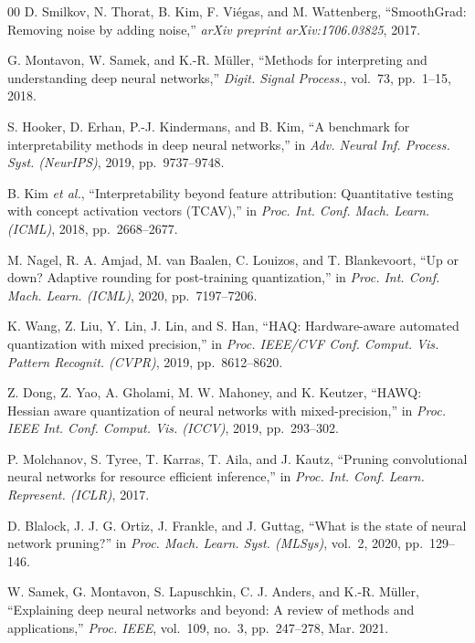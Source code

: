 \begin{thebibliography}{00}
D. Smilkov, N. Thorat, B. Kim, F. Vi\'egas, and M. Wattenberg, ``SmoothGrad:
Removing noise by adding noise,'' \textit{arXiv preprint arXiv:1706.03825},
2017.

G. Montavon, W. Samek, and K.-R. M\"uller, ``Methods for interpreting and
understanding deep neural networks,'' \textit{Digit. Signal Process.}, vol.\ 73,
pp.\ 1--15, 2018.

S. Hooker, D. Erhan, P.-J. Kindermans, and B. Kim, ``A benchmark for
interpretability methods in deep neural networks,'' in \textit{Adv. Neural Inf.
Process. Syst. (NeurIPS)}, 2019, pp.\ 9737--9748.

B. Kim \textit{et al.}, ``Interpretability beyond feature attribution:
Quantitative testing with concept activation vectors (TCAV),'' in \textit{Proc.
Int. Conf. Mach. Learn. (ICML)}, 2018, pp.\ 2668--2677.

M. Nagel, R. A. Amjad, M. van Baalen, C. Louizos, and T. Blankevoort, ``Up or
down? Adaptive rounding for post-training quantization,'' in \textit{Proc. Int.
Conf. Mach. Learn. (ICML)}, 2020, pp.\ 7197--7206.

K. Wang, Z. Liu, Y. Lin, J. Lin, and S. Han, ``HAQ: Hardware-aware automated
quantization with mixed precision,'' in \textit{Proc. IEEE/CVF Conf. Comput.
Vis. Pattern Recognit. (CVPR)}, 2019, pp.\ 8612--8620.

Z. Dong, Z. Yao, A. Gholami, M. W. Mahoney, and K. Keutzer, ``HAWQ: Hessian
aware quantization of neural networks with mixed-precision,'' in \textit{Proc.
IEEE Int. Conf. Comput. Vis. (ICCV)}, 2019, pp.\ 293--302.

P. Molchanov, S. Tyree, T. Karras, T. Aila, and J. Kautz, ``Pruning
convolutional neural networks for resource efficient inference,'' in
\textit{Proc. Int. Conf. Learn. Represent. (ICLR)}, 2017.

D. Blalock, J. J. G. Ortiz, J. Frankle, and J. Guttag, ``What is the state of
neural network pruning?'' in \textit{Proc. Mach. Learn. Syst. (MLSys)}, vol.\ 2,
2020, pp.\ 129--146.

W. Samek, G. Montavon, S. Lapuschkin, C. J. Anders, and K.-R. M\"uller,
``Explaining deep neural networks and beyond: A review of methods and
applications,'' \textit{Proc. IEEE}, vol.\ 109, no.\ 3, pp.\ 247--278, Mar.
2021.


\end{thebibliography}
